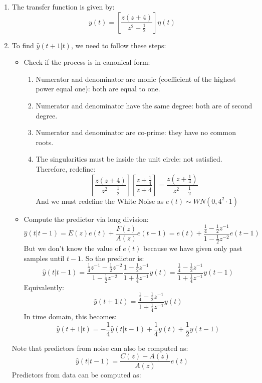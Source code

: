\begin{enumerate}
    \item The transfer function is given by:
        \[y(t)=\left[\dfrac{z(z+4)}{z^2-\frac{1}{2}}\right]\eta(t)\]
    \item To find $\hat{y}(t+1|t)$, we need to follow these steps:
        \begin{itemize}
            \item Check if the process is in canonical form:
                \begin{enumerate}
                    \item Numerator and denominator are monic (coefficient of the highest power equal one): both are equal to one.
                    \item Numerator and denominator have the same degree: both are of second degree.
                    \item Numerator and denominator are co-prime: they have no common roots.
                    \item The singularities must be inside the unit circle: not satisfied. 
                        Therefore, redefine: 
                        \[\left[\dfrac{z(z+4)}{z^2-\frac{1}{2}}\right]\left[\dfrac{z+\frac{1}{4}}{z+4}\right]=\dfrac{z\left(z+\frac{1}{4}\right)}{z^{2}-\frac{1}{2}}\]
                        And we must redefine the  White Noise as $e(t)\sim WN(0,4^2\cdot 1)$
                \end{enumerate}
            \item Compute the predictor via long division:
                \[\hat{y}(t|t-1)=E(z)e(t)+\dfrac{F(z)}{A(z)}e(t-1)=e(t)+\dfrac{\frac{1}{4}-\frac{1}{2}z^{-1}}{1-\frac{1}{2}z^{-2}}e(t-1)\]
                But we don't know the value of $e(t)$ because we have given only past samples until $t-1$.
                So the predictor is: 
                \[\hat{y}(t|t-1)=\dfrac{\frac{1}{4}z^{-1}-\frac{1}{2}z^{-2}}{1-\frac{1}{2}z^{-2}}\dfrac{1-\frac{1}{2}z^{-1}}{1+\frac{1}{4}z^{-1}}y(t)=\dfrac{\frac{1}{4}-\frac{1}{2}z^{-1}}{1+\frac{1}{4}z^{-1}}y(t-1)\]
                Equivalently: 
                \[\hat{y}(t+1|t)=\dfrac{\frac{1}{4}-\frac{1}{2}z^{-1}}{1+\frac{1}{4}z^{-1}}y(t)\]
                In time domain, this becomes:
                \[\hat{y}(t+1|t)=-\dfrac{1}{4}\hat{y}(t|t-1)+\dfrac{1}{4}y(t)+\dfrac{1}{2}y(t-1)\]
        \end{itemize}
        Note that predictors from noise can also be computed as:
        \[\hat{y}(t|t-1)=\dfrac{C(z)-A(z)}{A(z)}e(t)\]
        Predictors from data can be computed as:

\end{enumerate}
